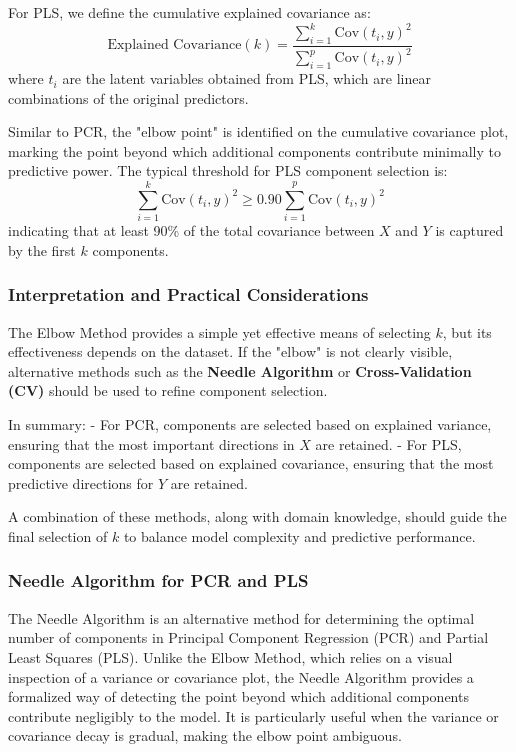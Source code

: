 \documentclass[11pt,twoside,a4paper]{article}
\begin{document}
For PLS, we define the cumulative explained covariance as:
\begin{equation}
\text{Explained Covariance}(k) = \frac{\sum_{i=1}^{k} \text{Cov}(t_i, y)^2}{\sum_{i=1}^{p} \text{Cov}(t_i, y)^2}
\end{equation}
where \( t_i \) are the latent variables obtained from PLS, which are linear combinations of the original predictors.

Similar to PCR, the "elbow point" is identified on the cumulative covariance plot, marking the point beyond which additional components contribute minimally to predictive power. The typical threshold for PLS component selection is:
\begin{equation}
\sum_{i=1}^{k} \text{Cov}(t_i, y)^2 \geq 0.90 \sum_{i=1}^{p} \text{Cov}(t_i, y)^2
\end{equation}
indicating that at least 90\% of the total covariance between \( X \) and \( Y \) is captured by the first \( k \) components.

\subsubsection{Interpretation and Practical Considerations}
The Elbow Method provides a simple yet effective means of selecting \( k \), but its effectiveness depends on the dataset. If the "elbow" is not clearly visible, alternative methods such as the \textbf{Needle Algorithm} or \textbf{Cross-Validation (CV)} should be used to refine component selection.

In summary:
- For PCR, components are selected based on explained variance, ensuring that the most important directions in \( X \) are retained.
- For PLS, components are selected based on explained covariance, ensuring that the most predictive directions for \( Y \) are retained.

A combination of these methods, along with domain knowledge, should guide the final selection of \( k \) to balance model complexity and predictive performance.

\subsubsection{Needle Algorithm for PCR and PLS}
The Needle Algorithm is an alternative method for determining the optimal number of components in Principal Component Regression (PCR) and Partial Least Squares (PLS). Unlike the Elbow Method, which relies on a visual inspection of a variance or covariance plot, the Needle Algorithm provides a formalized way of detecting the point beyond which additional components contribute negligibly to the model. It is particularly useful when the variance or covariance decay is gradual, making the elbow point ambiguous.
\end{document}
